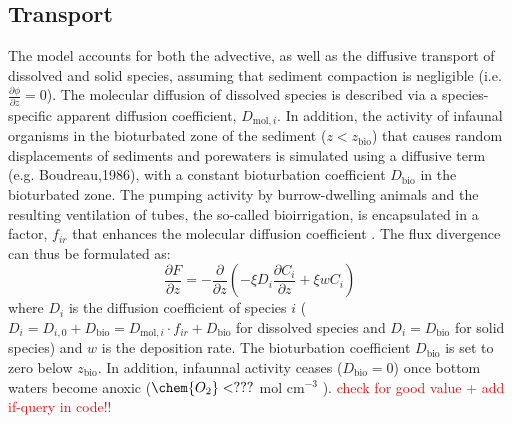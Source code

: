 \documentclass[gmd, manuscript]{copernicus}
\begin{document}
\subsection{Transport}\label{subsec:Transport}
The model accounts for both the advective, as well as the diffusive transport of dissolved and solid species, assuming that sediment compaction is negligible (i.e. $\frac{\partial \phi}{\partial z}=0$). 
The molecular diffusion of dissolved species is described via a species-specific apparent diffusion coefficient, $D_{\mathrm{mol},i}$. 
In addition, the activity of infaunal organisms in the bioturbated zone of the sediment ($z<z_{\mathrm{bio}}$) that causes random 
displacements of sediments and porewaters is simulated using a diffusive term (e.g. Boudreau,1986), with a constant bioturbation coefficient $D_{\mathrm{bio}}$ in the bioturbated zone. 
The pumping activity by burrow-dwelling animals and the resulting ventilation of tubes, the so-called bioirrigation, is encapsulated in a factor, $f_{ir}$ that enhances the molecular diffusion coefficient 
\citep[ hence, $D_{i,0}=D_{\mathrm{mol},i}\cdot f_{ir}$,][]{soetaert1996dynamic}. The flux divergence can thus be formulated as:
\begin{equation}
\frac{\partial F}{\partial z}=-\frac{\partial}{\partial z}\left( -\xi D_i \frac{\partial C_i}{\partial z} +\xi w C_i\right) \label{Eq_flux_divergence}
\end{equation}
where $D_i$ is the diffusion coefficient of species $i$ ($D_i=D_{i,0}+D_{\mathrm{bio}}=D_{\mathrm{mol},i}\cdot f_{ir}+D_{\mathrm{bio}}$ for dissolved species and $D_i=D_{\mathrm{bio}}$ for solid species) and $w$ is the 
deposition rate. 
The bioturbation coefficient $D_{\mathrm{bio}}$ is set to zero below $z_{\mathrm{bio}}$. In addition, infaunnal activity ceases ($D_{\mathrm{bio}}=0$) once bottom waters become anoxic ($\chem{O_2} < ???$ mol cm$^{-3}$ ). 
\textcolor{red}{check for good value + add if-query in code!!}
\end{document}
